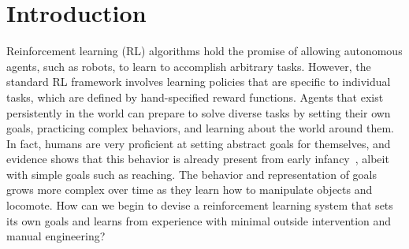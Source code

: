 % 



\section{Introduction}

Reinforcement learning (RL) algorithms hold the promise of allowing autonomous agents, such as robots, to learn to accomplish arbitrary tasks.
However, the standard RL framework involves learning policies that are specific to individual tasks, which are defined by hand-specified reward functions.
Agents that exist persistently in the world can prepare to solve diverse tasks by setting their own goals, practicing complex behaviors, and learning about the world around them.
In fact, humans are very proficient at setting abstract goals for themselves, and evidence shows that this behavior is already present from early infancy~\citep{smith2005development}, albeit with simple goals such as reaching.
The behavior and representation of goals grows more complex over time as they learn how to manipulate objects and locomote.
How can we begin to devise a reinforcement learning system that sets its own goals and learns from experience with minimal outside intervention and manual engineering?

